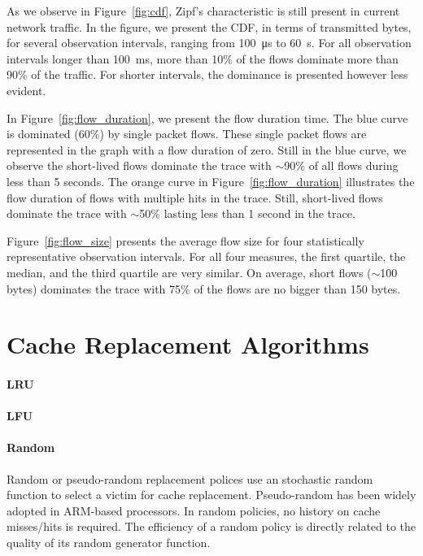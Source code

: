 As we observe in Figure~\ref{fig:cdf}, Zipf's characteristic is still present in current network traffic.
In the figure, we present the CDF, in terms of transmitted bytes, for several observation intervals, ranging from \SI{100}{\micro\second} to \SI{60}{\second}.
For all observation intervals longer than \SI{100}{\milli\second}, more than 10\% of the flows dominate more than 90\% of the traffic.
For shorter intervals, the dominance is presented however less evident.

In Figure~\ref{fig:flow_duration}, we present the flow duration time.
The blue curve is dominated (60\%) by single packet flows.
These single packet flows are represented in the graph with a flow duration of zero.
Still in the blue curve, we observe the short-lived flows dominate the trace with $\sim$90\% of all flows during less than 5 seconds.
The orange curve in Figure~\ref{fig:flow_duration} illustrates the flow duration of flows with multiple hits in the trace.
Still, short-lived flows dominate the trace with $\sim$50\% lasting less than 1 second in the trace.

Figure~\ref{fig:flow_size} presents the average flow size for four statistically representative observation intervals.
For all four measures, the first quartile, the median, and the third quartile are very similar.
On average, short flows ($\sim$100 bytes) dominates the trace with 75\% of the flows are no bigger than 150 bytes.

\section{Cache Replacement Algorithms}

\paragraph{LRU}

\paragraph{LFU}

\paragraph{Random}

Random or pseudo-random replacement polices use an stochastic random function to select a victim for cache replacement.
Pseudo-random has been widely adopted in ARM-based processors.
In random policies, no history on cache misses/hits is required.
The efficiency of a random policy is directly related to the quality of its random generator function.

